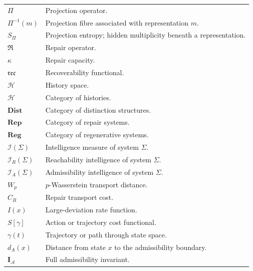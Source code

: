 \documentclass[12pt,twoside,openright]{book}
\newcommand{\hist}{\mathcal{H}}
\newcommand{\repair}{\mathfrak{R}}
\newcommand{\reco}{\mathfrak{rec}}
\begin{document}
\begin{center}
\begin{longtable}{p{3cm}p{10cm}}
$\Pi$
&
Projection operator.
\\

$\Pi^{-1}(m)$
&
Projection fibre associated with representation $m$.
\\

$S_\Pi$
&
Projection entropy; hidden multiplicity beneath a
representation.
\\

$\repair$
&
Repair operator.
\\

$\kappa$
&
Repair capacity.
\\

$\reco$
&
Recoverability functional.
\\

$\hist$
&
History space.
\\

$\mathcal H$
&
Category of histories.
\\

$\mathbf{Dist}$
&
Category of distinction structures.
\\

$\mathbf{Rep}$
&
Category of repair systems.
\\

$\mathbf{Reg}$
&
Category of regenerative systems.
\\

$\mathcal I(\Sigma)$
&
Intelligence measure of system $\Sigma$.
\\

$\mathcal I_R(\Sigma)$
&
Reachability intelligence of system $\Sigma$.
\\

$\mathcal I_A(\Sigma)$
&
Admissibility intelligence of system $\Sigma$.
\\

$W_p$
&
$p$-Wasserstein transport distance.
\\

$C_R$
&
Repair transport cost.
\\

$I(x)$
&
Large-deviation rate function.
\\

$S[\gamma]$
&
Action or trajectory cost functional.
\\

$\gamma(t)$
&
Trajectory or path through state space.
\\

$d_A(x)$
&
Distance from state $x$ to the admissibility boundary.
\\

$\mathbf I_{\mathcal A}$
&
Full admissibility invariant.
\\

\bottomrule
\end{longtable}
\end{center}
\end{document}
